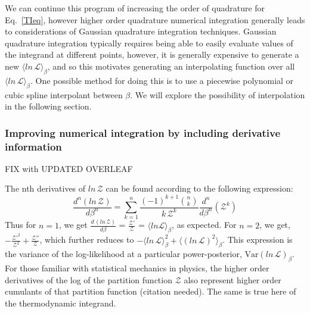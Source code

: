 We can continue this program of increasing the order of quadrature for Eq.~\ref{TIeq}, however higher order quadrature numerical integration generally leads to considerations of Gaussian quadrature integration techniques. Gaussian quadrature integration typically requires being able to easily evaluate values of the integrand at different points, however, it is generally expensive to generate a new $\langle ln \, \mathcal{L}\rangle_\beta$, and so this motivates  generating an interpolating function over all $\langle ln \, \mathcal{L}\rangle_\beta$. One possible method for doing this is to use a piecewise polynomial or cubic spline interpolant between $\beta$. We will explore the possibility of interpolation in the following section.

\subsubsection{Improving numerical integration by including derivative information}\label{subsubsec:TIDerivs}
FIX with UPDATED OVERLEAF

The nth derivatives of $ln \, \mathcal{Z}$ can be found according to the following expression:
\begin{equation}\label{TIderivatives}
    \frac{d^n \left(ln \, \mathcal{Z} \right)}{d\beta^n} = \sum^n_{k=1} \frac{\left(-1 \right)^{k+1} \binom{n}{k}}{k \, \mathcal{Z}^k} \frac{d^n}{d\beta^n} \left( \mathcal{Z}^k\right)
\end{equation}
Thus for $n=1$, we get $\frac{d \, \left(ln \,\mathcal{Z}\right)}{d \beta}$ = $\frac{\mathcal{Z}'}{\mathcal{Z}}$ = $\langle ln \mathcal{L} \rangle_\beta$, as expected. For $n=2$, we get, $-\frac{\mathcal{Z}'^2}{\mathcal{Z}^2} + \frac{\mathcal{Z}''}{\mathcal{Z}}$, which further reduces to $-\langle ln \, \mathcal{L}\rangle^2_\beta + \langle \left(ln \, \mathcal{L} \right)^2\rangle_\beta$. This expression is the variance of the log-likelihood at a particular power-posterior, $\mathrm{Var} \left(ln \, \mathcal{L} \right)_\beta$. For those familiar with statistical mechanics in physics, the higher order derivatives of the log of the partition function $\mathcal{Z}$ also represent higher order cumulants of that partition function (citation needed). The same is true here of the thermodynamic integrand.


